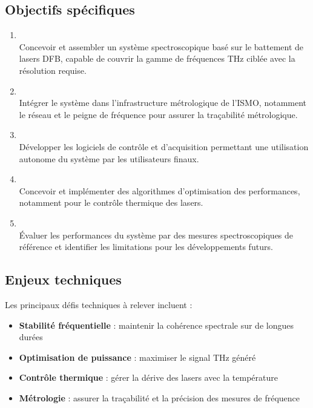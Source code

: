 \subsection{Objectifs spécifiques}

\begin{enumerate}
    \item \textbf{\objectiveone} \\
    Concevoir et assembler un système spectroscopique basé sur le battement de lasers DFB, capable de couvrir la gamme de fréquences THz ciblée avec la résolution requise.

    \item \textbf{\objectivetwo} \\
    Intégrer le système dans l'infrastructure métrologique de l'ISMO, notamment le réseau \REFIMEVE{} et le peigne de fréquence \DFCcore{} pour assurer la traçabilité métrologique.

    \item \textbf{\objectivethree} \\
    Développer les logiciels de contrôle et d'acquisition permettant une utilisation autonome du système par les utilisateurs finaux.

    \item \textbf{\objectivefour} \\
    Concevoir et implémenter des algorithmes d'optimisation des performances, notamment pour le contrôle thermique des lasers.

    \item \textbf{\objectivefive} \\
    Évaluer les performances du système par des mesures spectroscopiques de référence et identifier les limitations pour les développements futurs.
\end{enumerate}

\subsection{Enjeux techniques}

Les principaux défis techniques à relever incluent :
\begin{itemize}
    \item \textbf{Stabilité fréquentielle} : maintenir la cohérence spectrale sur de longues durées
    \item \textbf{Optimisation de puissance} : maximiser le signal THz généré
    \item \textbf{Contrôle thermique} : gérer la dérive des lasers avec la température
    \item \textbf{Métrologie} : assurer la traçabilité et la précision des mesures de fréquence
\end{itemize}

